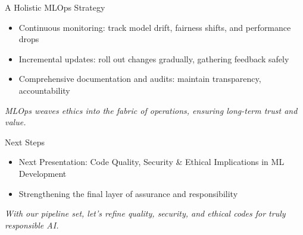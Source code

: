 \documentclass[aspectratio=169]{beamer}
\begin{document}
%
%
\begin{frame}{A Holistic MLOps Strategy}
\begin{itemize}
\item Continuous monitoring: track model drift, fairness shifts, and performance drops
\item Incremental updates: roll out changes gradually, gathering feedback safely
\item Comprehensive documentation and audits: maintain transparency, accountability
\end{itemize}

\vspace{0.8em}
\emph{MLOps weaves ethics into the fabric of operations, ensuring long-term trust and value.}
\end{frame}

%
%
\begin{frame}{Next Steps}
\begin{itemize}
\item Next Presentation: Code Quality, Security \& Ethical Implications in ML Development
\item Strengthening the final layer of assurance and responsibility
\end{itemize}

\vspace{0.8em}
\emph{With our pipeline set, let’s refine quality, security, and ethical codes for truly responsible AI.}
\end{frame}
\end{document}
